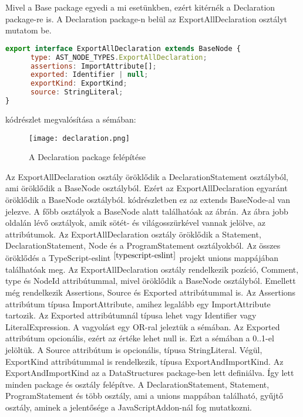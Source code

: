 \noindent

Mivel a Base package egyedi a mi esetünkben, ezért kitérnék a Declaration package-re is.
A Declaration package-n belül az ExportAllDeclaration osztályt mutatom be.

\begin{lstlisting}[caption={ExportAllDeclaration TypeScript megvalósítása},label={lst:ExportAllDeclaration}, language={JavaScript}]
export interface ExportAllDeclaration extends BaseNode {
      type: AST_NODE_TYPES.ExportAllDeclaration;
      assertions: ImportAttribute[];
      exported: Identifier | null;
      exportKind: ExportKind;
      source: StringLiteral;
}
\end{lstlisting}

 kódrészlet megvalósítása a sémában:

\begin{figure}[!htbp]
      \caption{A Declaration package felépítése}\label{fig:declaration_vpp}
      \centering
      \texttt{[image: declaration.png]}
\end{figure}

Az ExportAllDeclaration osztály öröklődik a DeclarationStatement osztályból, ami öröklődik a BaseNode osztályból.
Ezért az ExportAllDeclaration egyaránt öröklődik a BaseNode osztályból.
 kódrészletben ez az extends BaseNode-al van jelezve.
A főbb osztályok a BaseNode alatt találhatóak az ábrán.
Az ábra jobb oldalán lévő osztályok, amik sötét- és világosszürkével vannak jelölve, az attribútumok.
Az ExportAllDeclaration osztály öröklődik a Statement, DeclarationStatement, Node és a ProgramStatement osztályokból.
Az összes öröklődés a TypeScript-eslint$^{~\cite{typescript-eslint}}$ projekt unions mappájában találhatóak meg.
Az ExportAllDeclaration osztály rendelkezik pozíció, Comment, type és NodeId attribútummal, mivel öröklődik a BaseNode osztályból.
Emellett még rendelkezik Assertions, Source és Exported attribútummal is.
Az Assertions attribútum típusa ImportAttribute, amihez legalább egy ImportAttribute tartozik.
Az Exported attribútumnál típusa lehet vagy Identifier vagy LiteralExpression.
A vagyolást egy OR-ral jeleztük a sémában.
Az Exported attribútum opcionális, ezért az értéke lehet null is. Ezt a sémában a 0..1-el jelöltük.
A Source attribútum is opcionális, típusa StringLiteral.
Végül, ExportKind attribútummal is rendelkezik, típusa ExportAndImportKind.
Az ExportAndImportKind az a DataStructures package-ben lett definiálva.
Így lett minden package és osztály felépítve.
A DeclarationStatement, Statement, ProgramStatement és több osztály, ami a unions mappában található, gyűjtő osztály, aminek a jelentősége a JavaScriptAddon-nál fog mutatkozni.

